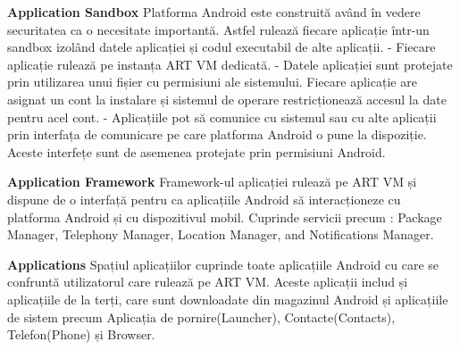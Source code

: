 \textbf{Application Sandbox}\newline
Platforma Android este construită având în vedere securitatea ca o necesitate importantă. Astfel rulează fiecare aplicație într-un sandbox izolând datele aplicației și codul executabil de alte aplicații.\newline
- Fiecare aplicație rulează pe instanța ART VM dedicată. \newline
- Datele aplicației sunt protejate prin utilizarea unui fișier cu permisiuni ale sistemului. Fiecare aplicație are asignat un cont la instalare și sistemul de operare restricționează accesul la date pentru acel cont.\newline
- Aplicațiile pot să comunice cu sistemul sau cu alte aplicații prin interfața de comunicare pe care platforma Android o pune la dispoziție. Aceste interfețe sunt de asemenea protejate prin permisiuni Android\cite{1}.\newline

\textbf{Application Framework}\newline
Framework-ul aplicației rulează pe ART VM și dispune de o interfață pentru ca aplicațiile Android să interacționeze cu platforma Android și cu dispozitivul mobil. Cuprinde servicii precum : Package Manager, Telephony Manager, Location Manager, and Notifications Manager.\cite{1}\newline


\textbf{Applications}\newline
Spațiul aplicațiilor cuprinde toate aplicațiile Android cu care se confruntă utilizatorul care rulează pe ART VM. Aceste aplicații includ și aplicațiile de la terți, care sunt downloadate din magazinul Android și aplicațiile de sistem precum Aplicația de pornire(Launcher), Contacte(Contacts), Telefon(Phone) și Browser. \cite{1}\newline

